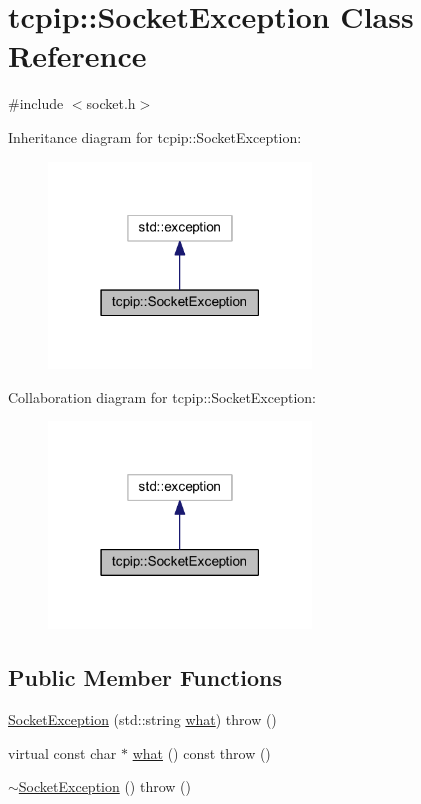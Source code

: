 \hypertarget{classtcpip_1_1_socket_exception}{}\section{tcpip\+:\+:Socket\+Exception Class Reference}
\label{classtcpip_1_1_socket_exception}


{\ttfamily \#include $<$socket.\+h$>$}



Inheritance diagram for tcpip\+:\+:Socket\+Exception\+:\nopagebreak
\begin{figure}[H]
\begin{center}
\leavevmode
\includegraphics[width=198pt]{classtcpip_1_1_socket_exception__inherit__graph}
\end{center}
\end{figure}


Collaboration diagram for tcpip\+:\+:Socket\+Exception\+:\nopagebreak
\begin{figure}[H]
\begin{center}
\leavevmode
\includegraphics[width=198pt]{classtcpip_1_1_socket_exception__coll__graph}
\end{center}
\end{figure}
\subsection*{Public Member Functions}
\begin{DoxyCompactItemize}
\item 
\hyperlink{classtcpip_1_1_socket_exception_a0a7e5fe0b6e39de21a90cc81ed69668a}{Socket\+Exception} (std\+::string \hyperlink{classtcpip_1_1_socket_exception_a37ca5e1050f6a8e1ee97f400945405cb}{what})  throw ()
\item 
virtual const char $\ast$ \hyperlink{classtcpip_1_1_socket_exception_a37ca5e1050f6a8e1ee97f400945405cb}{what} () const  throw ()
\item 
\hyperlink{classtcpip_1_1_socket_exception_a6c7058a26eeb13157f63ad4b46af4a68}{$\sim$\+Socket\+Exception} ()  throw ()
\end{DoxyCompactItemize}


